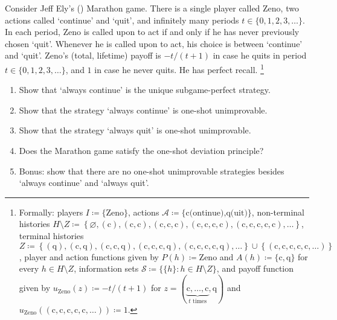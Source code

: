 \begin{exercise}
	\label{exercise:marathon}
	Consider Jeff Ely's (\citeyear{Ely2017online}) Marathon game. There is a single player called Zeno, two actions called `continue' and `quit', and infinitely many periods $t \in \{0,1,2,3,\dots\}$. In each period, Zeno is called upon to act if and only if he has never previously chosen `quit'. Whenever he is called upon to act, his choice is between `continue' and `quit'. Zeno's (total, lifetime) payoff is $-t/(t+1)$ in case he quits in period $t \in \{0,1,2,3,\dots\}$, and $1$ in case he never quits. He has perfect recall.%
		\footnote{Formally:
		players $I \coloneqq \{\text{Zeno}\}$,
		actions $\mathcal{A} \coloneqq \{ \text{c(ontinue),q(uit)} \}$,
		non-terminal histories $H \setminus Z \coloneqq \left\{ \varnothing, (\text{c}), (\text{c},\text{c}), (\text{c},\text{c},\text{c}), (\text{c},\text{c},\text{c},\text{c}), (\text{c},\text{c},\text{c},\text{c},\text{c}), \dots \right\}$, 
		terminal histories $Z \coloneqq \left\{ (\text{q}), (\text{c},\text{q}), (\text{c},\text{c},\text{q}), (\text{c},\text{c},\text{c},\text{q}), (\text{c},\text{c},\text{c},\text{c},\text{q}), \dots \right\} \cup \left\{ (\text{c},\text{c},\text{c},\text{c},\text{c},\dots) \right\}$,
		player and action functions given by $P(h) \coloneqq \text{Zeno}$ and $A(h) \coloneqq \{ \text{c}, \text{q} \}$ for every $h \in H \setminus Z$,
		information sets $\mathcal{S} \coloneqq \{ \{h\} : h \in H \setminus Z \}$,
		and payoff function given by $u_{\text{Zeno}}(z) \coloneqq -t/(t+1)$ for $z = (\underbrace{\text{c},\dots,\text{c}}_{\text{$t$ times}},\text{q})$ and $u_{\text{Zeno}}((\text{c},\text{c},\text{c},\text{c},\text{c},\dots)) \coloneqq 1$.}

	\begin{enumerate}[label=(\alph*)]

		\item Show that `always continue' is the unique subgame-perfect strategy.

		\item Show that the strategy `always continue' is one-shot unimprovable.

		\item Show that the strategy `always quit' is one-shot unimprovable.

		\item Does the Marathon game satisfy the one-shot deviation principle?

		\item Bonus: show that there are no one-shot unimprovable strategies besides `always continue' and `always quit'.
	
	\end{enumerate}
\end{exercise}

